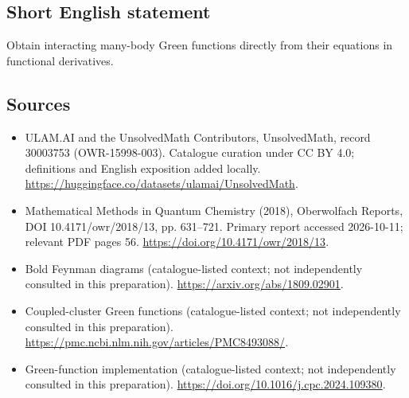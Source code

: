 \documentclass[11pt]{article}
\begin{document}
\subsection{Short English statement}
Obtain interacting many-body Green functions directly from their equations in functional derivatives.
\subsection{Sources}
\begin{itemize}
\item[\hypertarget{source:30003753:1}{S1}] ULAM.AI and the UnsolvedMath Contributors, UnsolvedMath, record 30003753 (OWR-15998-003). Catalogue curation under CC BY 4.0; definitions and English exposition added locally.
\url{https://huggingface.co/datasets/ulamai/UnsolvedMath}.
\item[\hypertarget{source:30003753:2}{S2}] Mathematical Methods in Quantum Chemistry (2018), Oberwolfach Reports, DOI 10.4171/owr/2018/13, pp. 631--721. Primary report accessed 2026-10-11; relevant PDF pages 56.
\url{https://doi.org/10.4171/owr/2018/13}.
\item[\hypertarget{source:30003753:3}{S3}] Bold Feynman diagrams (catalogue-listed context; not independently consulted in this preparation).
\url{https://arxiv.org/abs/1809.02901}.
\item[\hypertarget{source:30003753:4}{S4}] Coupled-cluster Green functions (catalogue-listed context; not independently consulted in this preparation).
\url{https://pmc.ncbi.nlm.nih.gov/articles/PMC8493088/}.
\item[\hypertarget{source:30003753:5}{S5}] Green-function implementation (catalogue-listed context; not independently consulted in this preparation).
\url{https://doi.org/10.1016/j.cpc.2024.109380}.
\end{itemize}
\label{end:30003753}
\end{document}
